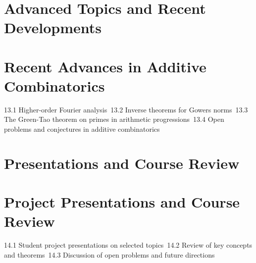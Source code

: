 \section{Advanced Topics and Recent Developments}
\section{Recent Advances in Additive Combinatorics}
13.1 Higher-order Fourier analysis\
13.2 Inverse theorems for Gowers norms\
13.3 The Green-Tao theorem on primes in arithmetic progressions\
13.4 Open problems and conjectures in additive combinatorics\
\section{Presentations and Course Review}
\section{Project Presentations and Course Review}
14.1 Student project presentations on selected topics\
14.2 Review of key concepts and theorems\
14.3 Discussion of open problems and future directions\
